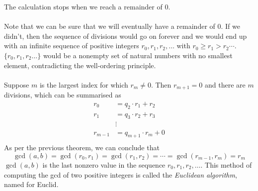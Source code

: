 \documentclass{report}
\theoremstyle{definition}
\begin{document}
The calculation stops when we reach a remainder of 0.\\
\vspace{1mm}\\
Note that we can be sure that we will eventually have a remainder of 0. If we didn't, then the sequence of divisions would go on forever and we would end up with an infinite sequence of positive
integers $r_0,r_1,r_2,\ldots$ with $r_0\geq r_1>r_2\cdots$. $\{r_0,r_1,r_2\ldots\}$ would be 
a nonempty set of natural numbers with no smallest element, contradicting the well-ordering principle.\\
\vspace{1mm}\\
Suppose $m$ is the largest index for which $r_m\neq0$. Then $r_{m+1}=0$ and there are $m$ divisions, which can be summarised as
\begin{align*}
r_0&=q_2\cdot r_1+r_2\\
r_1&=q_3\cdot r_2+r_3\\
&\vdots\\
r_{m-1}&=q_{m+1}\cdot r_m+0\\
\end{align*}
As per the previous theorem, we can conclude that
\begin{equation*}
\gcd(a,b)=\gcd(r_0,r_1)=\gcd(r_1,r_2)=\cdots=\gcd(r_{m-1},r_m)=r_m
\end{equation*}
$\gcd(a,b)$ is the last nonzero value in the sequence $r_0,r_1,r_2,\ldots$. This method of computing the gcd of two positive integers is called the \textit{Euclidean algorithm}, named for Euclid.
\newpage
\end{document}
